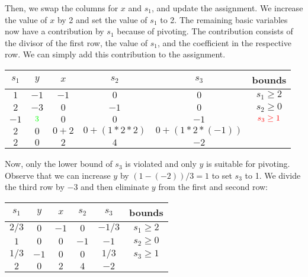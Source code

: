 \documentclass{article}
\begin{document}
Then, we swap the columns for \(x\) and \(s_1\), and update the assignment.
We increase the value of \(x\) by 2 and set the value of \(s_1\) to 2.
The remaining basic variables now have a contribution by \(s_1\) because of pivoting.
The contribution consists of the divisor of the first row, the value of \(s_1\), and the coefficient in the respective row.
We can simply add this contribution to the assignment.
\begin{center}
\begin{tabular}{cccccc}
\toprule
\multicolumn{1}{c}{\(s_1\)} &
\multicolumn{1}{c}{\(y\)} &
\multicolumn{1}{c}{\(x\)} &
\multicolumn{1}{c}{\(s_2\)} &
\multicolumn{1}{c}{\(s_3\)} &
\multicolumn{1}{c}{bounds}\\
\midrule
\(1\)        & \(-1\)             & \(-1\)  & \(0\)       & \(0\)          & \(s_1 \geq 2\) \\
\(2\)        & \(-3\)             & \(0\)   & \(-1\)      & \(0\)          & \(s_2 \geq 0\) \\
\(-1\)       & \(\color{green}3\) & \(0\)   & \(0\)       & \(-1\)         & \(\textcolor{red}{s_3 \geq 1}\) \\
\midrule
\(2\)        & \(0\)              & \(0+2\) & \(0+(1*2*2)\) & \(0+(1*2*(-1))\)\\
\(2\)        & \(0\)              & \(2\)   & \(4\)       & \(-2\)\\
\bottomrule
\end{tabular}
\end{center}

Now, only the lower bound of \(s_3\) is violated and only \(y\) is suitable for pivoting.
Observe that we can increase \(y\) by \((1-(-2))/3=1\) to set \(s_3\) to 1.
We divide the third row by \(-3\) and then eliminate \(y\) from the first and second row:
\begin{center}
\begin{tabular}{cccccc}
\toprule
\multicolumn{1}{c}{\(s_1\)} &
\multicolumn{1}{c}{\(y\)} &
\multicolumn{1}{c}{\(x\)} &
\multicolumn{1}{c}{\(s_2\)} &
\multicolumn{1}{c}{\(s_3\)} &
\multicolumn{1}{c}{bounds}\\
\midrule
\(2/3\) & \(0\)  & \(-1\) & \(0\)  & \(-1/3\) & \(s_1 \geq 2\) \\
\(1\)   & \(0\)  & \(0\)  & \(-1\) & \(-1\)   & \(s_2 \geq 0\) \\
\(1/3\) & \(-1\) & \(0\)  & \(0\)  & \(1/3\)  & \(s_3 \geq 1\) \\
\midrule
\(2\)   & \(0\)  & \(2\)  & \(4\)  & \(-2\)\\
\bottomrule
\end{tabular}
\end{center}
\end{document}
